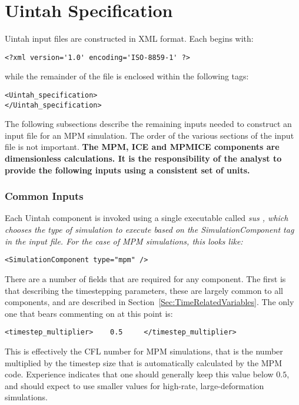 \section{Uintah Specification} \label{Sec:UintahSpecMPM}

Uintah input files are constructed in XML format.  Each begins with:

\begin{Verbatim}[fontsize=\footnotesize]
<?xml version='1.0' encoding='ISO-8859-1' ?>
\end{Verbatim}
while the remainder of the file is enclosed within the following tags:
\begin{Verbatim}[fontsize=\footnotesize]
<Uintah_specification>
</Uintah_specification>
\end{Verbatim}

The following subsections describe the remaining inputs needed to construct
an input file for an MPM simulation.  The order of the various sections 
of the input file is not important.  {\bf The MPM, ICE and MPMICE components
are dimensionless calculations.  It is the responsibility of the analyst
to provide the following inputs using a consistent set of units.}

\subsubsection{Common Inputs} \label{Sec:commonInputs}

Each Uintah component is invoked using a single executable called
\it sus \normalfont, which chooses the type of simulation
to execute based on the \it SimulationComponent \normalfont tag in the
input file.  For the case of MPM simulations, this looks like:

\begin{Verbatim}[fontsize=\footnotesize]
 <SimulationComponent type="mpm" />
\end{Verbatim}

There are a number of fields that are required for any component.  The first
is that describing the timestepping parameters, these are largely common to
all components, and are described in Section~\ref{Sec:TimeRelatedVariables}.
The only one that bears commenting on at this point is:

\begin{Verbatim}[fontsize=\footnotesize]
  <timestep_multiplier>    0.5     </timestep_multiplier>
\end{Verbatim}
This is effectively the CFL number for MPM simulations, that is the number
multiplied by the timestep size that is automatically calculated by the MPM
code.  Experience indicates that one should generally keep this value below
$0.5$, and should expect to use smaller values for high-rate, large-deformation
simulations.

